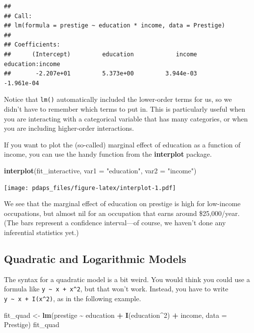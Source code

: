 \documentclass[
  12pt,
  oneside,openany]{book}
\newenvironment{Shaded}{\begin{snugshade}}{\end{snugshade}}
\newcommand{\DataTypeTok}[1]{\textcolor[rgb]{0.13,0.29,0.53}{#1}}
\newcommand{\DecValTok}[1]{\textcolor[rgb]{0.00,0.00,0.81}{#1}}
\newcommand{\KeywordTok}[1]{\textcolor[rgb]{0.13,0.29,0.53}{\textbf{#1}}}
\newcommand{\NormalTok}[1]{#1}
\newcommand{\OperatorTok}[1]{\textcolor[rgb]{0.81,0.36,0.00}{\textbf{#1}}}
\newcommand{\StringTok}[1]{\textcolor[rgb]{0.31,0.60,0.02}{#1}}
\begin{document}
\begin{verbatim}
## 
## Call:
## lm(formula = prestige ~ education * income, data = Prestige)
## 
## Coefficients:
##      (Intercept)         education            income  education:income  
##       -2.207e+01         5.373e+00         3.944e-03        -1.961e-04
\end{verbatim}

Notice that \texttt{lm()} automatically included the lower-order terms for us, so we didn't have to remember which terms to put in. This is particularly useful when you are interacting with a categorical variable that has many categories, or when you are including higher-order interactions.

If you want to plot the (so-called) marginal effect of education as a function of income, you can use the handy function from the \textbf{interplot} package.

\begin{Shaded}
\begin{Highlighting}[]
\KeywordTok{interplot}\NormalTok{(fit\_interactive, }\DataTypeTok{var1 =} \StringTok{"education"}\NormalTok{, }\DataTypeTok{var2 =} \StringTok{"income"}\NormalTok{)}
\end{Highlighting}
\end{Shaded}

\texttt{[image: pdaps\_files/figure-latex/interplot-1.pdf]}

We see that the marginal effect of education on prestige is high for low-income occupations, but almost nil for an occupation that earns around \$25,000/year. (The bars represent a confidence interval---of course, we haven't done any inferential statistics yet.)

\hypertarget{quadratic-and-logarithmic-models}{%
\subsection{Quadratic and Logarithmic Models}\label{quadratic-and-logarithmic-models}}

The syntax for a quadratic model is a bit weird. You would think you could use a formula like \texttt{y\ \textasciitilde{}\ x\ +\ x\^{}2}, but that won't work. Instead, you have to write \texttt{y\ \textasciitilde{}\ x\ +\ I(x\^{}2)}, as in the following example.

\begin{Shaded}
\begin{Highlighting}[]
\NormalTok{fit\_quad <{-}}\StringTok{ }\KeywordTok{lm}\NormalTok{(prestige }\OperatorTok{\textasciitilde{}}\StringTok{ }\NormalTok{education }\OperatorTok{+}\StringTok{ }\KeywordTok{I}\NormalTok{(education}\OperatorTok{\^{}}\DecValTok{2}\NormalTok{) }\OperatorTok{+}\StringTok{ }\NormalTok{income, }\DataTypeTok{data =}\NormalTok{ Prestige)}
\NormalTok{fit\_quad}
\end{Highlighting}
\end{Shaded}
\end{document}
